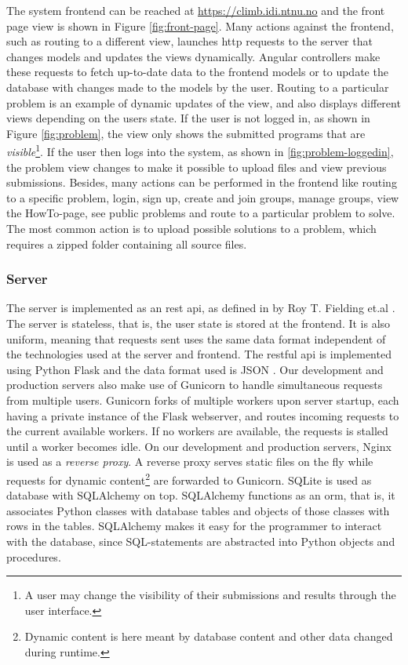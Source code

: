 The system frontend can be reached at \url{https://climb.idi.ntnu.no} and the front page view is shown in Figure \ref{fig:front-page}. Many actions against the frontend, such as routing to a different view, launches \gls{http} requests to the server that changes models and updates the views dynamically. Angular controllers make these requests to fetch up-to-date data to the frontend models or to update the database with changes made to the models by the user. Routing to a particular problem is an example of dynamic updates of the view, and also displays different views depending on the users state. If the user is not logged in, as shown in Figure \ref{fig:problem}, the view only shows the submitted programs that are \textit{visible}\footnote{A user may change the visibility of their submissions and results through the user interface.}. If the user then logs into the system, as shown in \ref{fig:problem-loggedin}, the problem view changes to make it possible to upload files and view previous submissions. Besides, many actions can be performed in the frontend like routing to a specific problem, login, sign up, create and join groups, manage groups, view the HowTo-page, see public problems and route to a particular problem to solve. The most common action is to upload possible solutions to a problem, which requires a zipped folder containing all source files. \\



\subsubsection{Server} The server is implemented as an \gls{rest} \gls{api}, as defined in by Roy T. Fielding et.al \cite{a:rtf}. The server is stateless, that is, the user state is stored at the frontend. It is also uniform, meaning that requests sent uses the same data format independent of the technologies used at the server and frontend. The \gls{rest}ful \gls{api} is implemented using Python Flask \cite{FLASK} and the data format used is JSON \cite{JSON}. Our development and production servers also make use of Gunicorn \cite{GUNICORN} to handle simultaneous requests from multiple users. Gunicorn forks of multiple workers upon server startup, each having a private instance of the Flask webserver, and routes incoming requests to the current available workers. If no workers are available, the requests is stalled until a worker becomes idle. On our development and production servers, Nginx \cite{NGINX} is used as a \textit{reverse proxy}. A reverse proxy serves static files on the fly while requests for dynamic content\footnote{Dynamic content is here meant by database content and other data changed during runtime.} are forwarded to Gunicorn. SQLite \cite{SQLITE} is used as database with SQLAlchemy \cite{SQLALCHEMY} on top. SQLAlchemy functions as an \gls{orm}, that is, it associates Python classes with database tables and objects of those classes with rows in the tables. SQLAlchemy makes it easy for the programmer to interact with the database, since SQL-statements are abstracted into Python objects and procedures. \\

